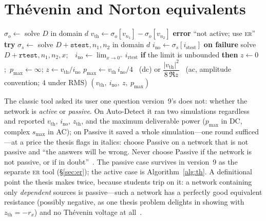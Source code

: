 \documentclass[11pt,oneside]{report}
\newcommand{\kw}[1]{\textsc{#1}}
\newcommand{\code}[1]{\texttt{#1}}
\begin{document}
\section{Th\'evenin and Norton equivalents}
\label{sec:th}

\begin{algorithm}[htbp]
\caption{\kw{Thevenin}$(D, n_1, n_2, d)$: equivalent seen from a port}
\label{alg:th}
\begin{algorithmic}[1]
\State $\sigma_o \gets$ solve $D$ in domain $d$
\State $v_\mathrm{th} \gets \sigma_o[v_{n_1}] - \sigma_o[v_{n_2}]$
  \textbf{error} ``not active; use \kw{er}''
\EndIf
\State \textbf{try} $\sigma_s \gets$
  solve $D + \code{stest},n_1,n_2$ in domain $d$
\State \quad $i_\mathrm{no} \gets \sigma_s[i_\mathrm{stest}]$
\State \textbf{on failure} 
\State \quad solve $D + \code{rtest},n_1,n_2,x$;\ \
  $i_\mathrm{no} \gets \lim_{x \to 0^+} i_\mathrm{rtest}$
\State \quad \textbf{if} the limit is unbounded \textbf{then}
  $z \gets 0$;\ $p_\mathrm{max} \gets \infty$; \Return
\State $z \gets v_\mathrm{th} / i_\mathrm{no}$
\State $p_\mathrm{max} \gets v_\mathrm{th}\, i_\mathrm{no}/4$ \ (dc)
  \quad or \quad $\dfrac{|v_\mathrm{th}|^2}{8\,\Re z}$ \ (ac,
  amplitude convention; $4$ under RMS)
\State \Return $(v_\mathrm{th},\ i_\mathrm{no},\ z,\ p_\mathrm{max})$
\end{algorithmic}
\end{algorithm}

The classic tool asked its user one question version~9's does not:
whether the network is \emph{active} or \emph{passive}. On
Auto-Detect it ran two simulations regardless and reported
$v_\mathrm{th}$, $i_\mathrm{no}$, $z_\mathrm{th}$, and the maximum
deliverable power ($p_\mathrm{max}$ in DC, complex $s_\mathrm{max}$
in AC); on Passive it saved a whole simulation---one round
sufficed---at a price the thesis flags in italics: choose Passive on
a network that is not passive and ``the answers will be wrong. Never
choose Passive if the network is not passive, or if in
doubt''~\cite[\S5.2]{thesis2000}. The passive case survives in
version~9 as the separate \kw{er} tool (\S\ref{sec:er}); the active
case is Algorithm~\ref{alg:th}. A definitional point the thesis
makes twice, because students trip on it: a network containing only
\emph{dependent} sources is passive---such a network has a perfectly
good equivalent resistance (possibly negative, as one thesis problem
delights in showing with $z_\mathrm{th} = -r_x$) and no Th\'evenin
voltage at all~\cite[\S5.3, \S9.3]{thesis2000}.
\end{document}
